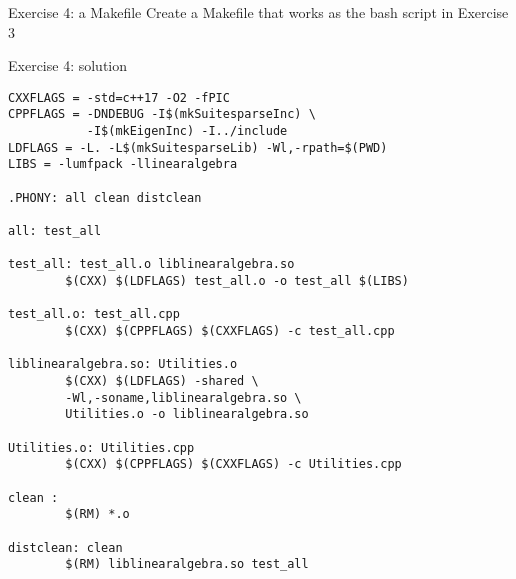 \documentclass[10pt]{beamer}
\begin{document}
\begin{frame}{Exercise 4: a Makefile}
Create a Makefile that works as the bash script in Exercise 3
\end{frame}

\begin{frame}{Exercise 4: solution}
\begin{verbatim}
CXXFLAGS = -std=c++17 -O2 -fPIC
CPPFLAGS = -DNDEBUG -I$(mkSuitesparseInc) \
           -I$(mkEigenInc) -I../include
LDFLAGS = -L. -L$(mkSuitesparseLib) -Wl,-rpath=$(PWD)
LIBS = -lumfpack -llinearalgebra

.PHONY: all clean distclean

all: test_all

test_all: test_all.o liblinearalgebra.so
        $(CXX) $(LDFLAGS) test_all.o -o test_all $(LIBS)

test_all.o: test_all.cpp
        $(CXX) $(CPPFLAGS) $(CXXFLAGS) -c test_all.cpp

liblinearalgebra.so: Utilities.o
        $(CXX) $(LDFLAGS) -shared \
        -Wl,-soname,liblinearalgebra.so \
        Utilities.o -o liblinearalgebra.so

Utilities.o: Utilities.cpp
        $(CXX) $(CPPFLAGS) $(CXXFLAGS) -c Utilities.cpp

clean :
        $(RM) *.o 

distclean: clean
        $(RM) liblinearalgebra.so test_all
\end{verbatim}
\end{frame}
\end{document}
